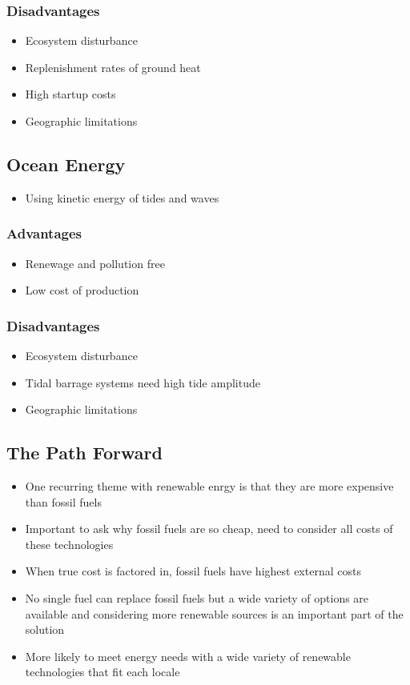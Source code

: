 \documentclass[11pt]{article}
\begin{document}
\subsubsection{Disadvantages}
\label{sec:orgfa1907a}
\begin{itemize}
\item Ecosystem disturbance
\item Replenishment rates of ground heat
\item High startup costs
\item Geographic limitations
\end{itemize}
\subsection{Ocean Energy}
\label{sec:org3e52a85}
\begin{itemize}
\item Using kinetic energy of tides and waves
\end{itemize}
\subsubsection{Advantages}
\label{sec:orge353dfb}
\begin{itemize}
\item Renewage and pollution free
\item Low cost of production
\end{itemize}
\subsubsection{Disadvantages}
\label{sec:org89fd3bf}
\begin{itemize}
\item Ecosystem disturbance
\item Tidal barrage systems need high tide amplitude
\item Geographic limitations
\end{itemize}
\subsection{The Path Forward}
\label{sec:org21fbacd}
\begin{itemize}
\item One recurring theme with renewable enrgy is that they are more expensive than fossil fuels
\item Important to ask why fossil fuels are so cheap, need to consider all costs of these technologies
\item When true cost is factored in, fossil fuels have highest external costs
\item No single fuel can replace fossil fuels but a wide variety of options are available and considering more renewable sources is an important part of the solution
\item More likely to meet energy needs with a wide variety of renewable technologies that fit each locale
\end{itemize}
\end{document}
